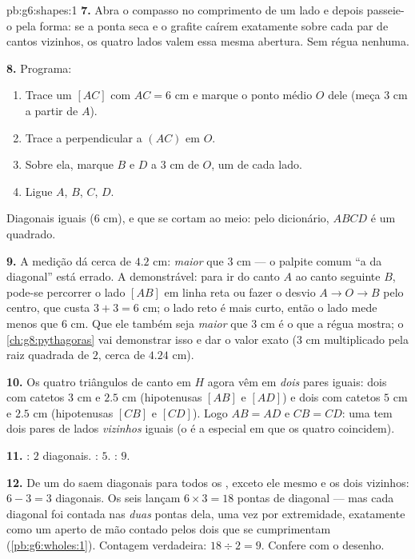 \begin{solution}{pb:g6:shapes:1}
\textbf{7.} Abra o compasso no comprimento de um lado e depois
passeie-o pela forma: se a ponta seca e o grafite caírem exatamente
sobre cada par de cantos vizinhos, os quatro lados valem essa mesma
abertura. Sem régua nenhuma.

\textbf{8.} Programa:
\begin{enumerate}
  \item Trace um  $[AC]$ com $AC = 6$ cm e marque o ponto médio
        $O$ dele (meça $3$ cm a partir de $A$).
  \item Trace a perpendicular a $(AC)$ em $O$.
  \item Sobre ela, marque $B$ e $D$ a $3$ cm de $O$, um de cada lado.
  \item Ligue $A$, $B$, $C$, $D$.
\end{enumerate}
Diagonais iguais ($6$ cm),  e que se cortam ao meio:
pelo dicionário, $ABCD$ é um quadrado.

\textbf{9.} A medição dá cerca de $4.2$ cm: \emph{maior} que $3$ cm ---
o palpite comum ``a  da diagonal'' está errado. A 
demonstrável: para ir do canto $A$ ao canto seguinte $B$, pode-se
percorrer o lado $[AB]$ em linha reta ou fazer o desvio
$A \to O \to B$ pelo centro, que custa $3 + 3 = 6$ cm; o lado reto é
mais curto, então o lado mede menos que $6$ cm. Que ele também seja
\emph{maior} que $3$ cm é o que a régua mostra; o
\cref{ch:g8:pythagoras} vai demonstrar isso e dar o valor exato ($3$ cm
multiplicado pela raiz quadrada de $2$, cerca de $4.24$ cm).

\textbf{10.} Os quatro triângulos de canto em $H$ agora vêm em
\emph{dois} pares iguais: dois com catetos $3$ cm e $2.5$ cm
(hipotenusas $[AB]$ e $[AD]$) e dois com catetos $5$ cm e $2.5$ cm
(hipotenusas $[CB]$ e $[CD]$). Logo $AB = AD$ e $CB = CD$: uma  tem
dois pares de lados \emph{vizinhos} iguais (o  é a  especial
em que os quatro coincidem).

\textbf{11.} : $2$ diagonais. : $5$. :
$9$.

\textbf{12.} De um  do  saem diagonais para todos os
, exceto ele mesmo e os dois vizinhos: $6 - 3 = 3$ diagonais.
Os seis  lançam $6 \times 3 = 18$ pontas de diagonal --- mas
cada diagonal foi contada nas \emph{duas} pontas dela, uma vez por
extremidade, exatamente como um aperto de mão contado pelos dois que se
cumprimentam (\cref{pb:g6:wholes:1}). Contagem verdadeira:
$18 \div 2 = 9$. Confere com o desenho.


\end{solution}
